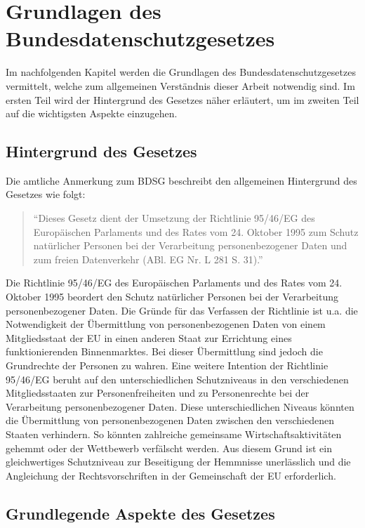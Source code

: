 \chapter{Grundlagen des Bundesdatenschutzgesetzes}
\label{Grundlagen}
Im nachfolgenden Kapitel werden die Grundlagen des Bundesdatenschutzgesetzes vermittelt, welche zum allgemeinen Verständnis dieser Arbeit notwendig sind. Im ersten Teil wird der Hintergrund des Gesetzes näher erläutert, um im zweiten Teil auf  die wichtigsten Aspekte einzugehen.
\section{Hintergrund des Gesetzes}
Die amtliche Anmerkung zum \ac{BDSG} beschreibt den allgemeinen Hintergrund des Gesetzes wie folgt:
\begin{quote}
"`Dieses Gesetz dient der Umsetzung der Richtlinie 95/46/EG des Europäischen Parlaments und des Rates vom 24. Oktober 1995 zum Schutz natürlicher Personen bei der Verarbeitung personenbezogener Daten und zum freien Datenverkehr (ABl. EG Nr. L 281 S. 31)."' \autocite[][]{DeJureBDSG}
\end{quote}
Die Richtlinie 95/46/EG des Europäischen Parlaments und des Rates vom 24. Oktober 1995 beordert den Schutz natürlicher Personen bei der Verarbeitung personenbezogener Daten. Die Gründe für das Verfassen der Richtlinie ist u.a. die Notwendigkeit der Übermittlung von personenbezogenen Daten von einem Mitgliedsstaat der \ac{EU} in einen anderen Staat zur Errichtung eines funktionierenden Binnenmarktes. Bei dieser Übermittlung sind jedoch die Grundrechte der Personen zu wahren. Eine weitere Intention der Richtlinie 95/46/EG beruht auf den unterschiedlichen Schutzniveaus in den verschiedenen Mitgliedsstaaten zur Personenfreiheiten und zu Personenrechte bei der Verarbeitung personenbezogener Daten. Diese unterschiedlichen Niveaus könnten die Übermittlung von personenbezogenen Daten zwischen den verschiedenen Staaten verhindern. So könnten zahlreiche gemeinsame Wirtschaftsaktivitäten gehemmt oder der Wettbewerb verfälscht werden. Aus diesem Grund ist ein gleichwertiges Schutzniveau zur Beseitigung der Hemmnisse unerlässlich und die Angleichung der Rechtsvorschriften in der Gemeinschaft der \ac{EU} erforderlich.\autocite[vgl.][]{EU.1995}\\
\section{Grundlegende Aspekte des Gesetzes}
